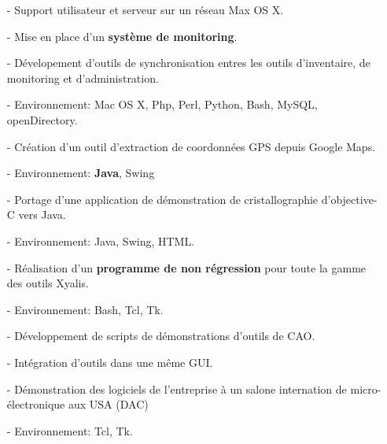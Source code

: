 \documentclass[10pt,a4paper]{moderncv}
\begin{document}
{
\begin{itemize}
\item[-]{Support utilisateur et serveur sur un r\'{e}seau Max OS X.}
\item[-]{Mise en place d'un \textbf{syst\`{e}me de monitoring}.}
\item[-]{D\'{e}velopement d'outils de synchronisation entres les outils d'inventaire, de monitoring et d'administration.}
\item[-]{Environnement: Mac OS X, Php, Perl, Python, Bash, MySQL, openDirectory.}
\end{itemize}
}

{
\begin{itemize}
\item[-]{Cr\'{e}ation d'un outil d'extraction de coordonn\'{e}es GPS depuis Google Maps.}
\item[-]{Environnement: \textbf{Java}, Swing}
\end{itemize}
}

{
\begin{itemize}
\item[-]{Portage d'une application de d\'{e}monstration de cristallographie d'objective-C vers Java.}
\item[-]{Environnement: Java, Swing, HTML.}
\end{itemize}
}

{
\begin{itemize}
\item[-]{R\'{e}alisation d'un \textbf {programme de non r\'{e}gression} pour toute la gamme des outils Xyalis.}
\item[-]{Environnement: Bash, Tcl, Tk.}
\end{itemize}
}

{
\begin{itemize}
\item[-]{D\'{e}veloppement de scripts de d\'{e}monstrations d'outils de CAO.}
\item[-]{Int\'{e}gration d'outils dans une même GUI.}
\item[-]{D\'{e}monstration des logiciels de l'entreprise \`{a} un salone internation de micro-\'{e}lectronique aux USA (DAC)}
\item[-]{Environnement: Tcl, Tk.}
\end{itemize}
}
\end{document}
